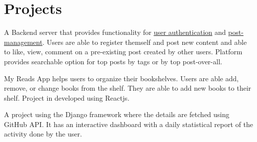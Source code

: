\documentclass[]{Kushagra-build}
\begin{document}
\begin{minipage}[t]{0.70\textwidth}
\section{Projects}


\vspace{0.5em}

A Backend server that provides functionality for \underline{user authentication} and \underline{post-management}. Users are able to register themself and post new content and able to like, view, comment on a pre-existing post created by other users. Platform provides searchable option for top posts by tags or by top post-over-all.
\sectionsep


\vspace{0.5em}
My Reads App helps users to organize their bookshelves. Users are able add, remove, or change books from the shelf. They are able to add new books to their shelf. Project in developed using Reactjs.
\sectionsep

\vspace{0.5em}
 A project using the Django framework where the details are fetched using GitHub API. It has an interactive dashboard with a daily statistical report of the activity done by the user.
\sectionsep

\sectionsep
\end{minipage} 
\end{document}
